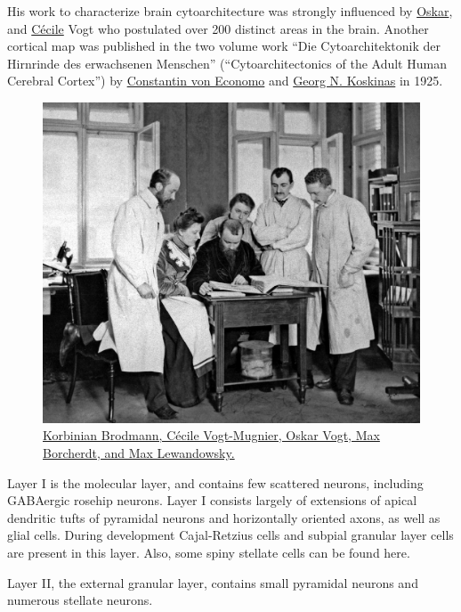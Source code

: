 His work to characterize brain cytoarchitecture was strongly influenced by \href{https://en.wikipedia.org/wiki/Oskar_Vogt}{Oskar}, and \href{https://en.wikipedia.org/wiki/Cécile_Vogt-Mugnier}{Cécile} Vogt who postulated over 200 distinct areas in the brain. Another cortical map was published in the two volume work ``Die Cytoarchitektonik der Hirnrinde des erwachsenen Menschen'' (``Cytoarchitectonics of the Adult Human Cerebral Cortex'') by \href{https://en.wikipedia.org/wiki/Constantin_von_Economo}{Constantin von Economo} and \href{https://en.wikipedia.org/wiki/Georg_N._Koskinas}{Georg N. Koskinas} in 1925.



\begin{figure}

{\centering \includegraphics[width=0.7\linewidth]{./figures/cns/Lewandowsky_Vogts_Brodmann} 

}

\caption{\href{https://commons.wikimedia.org/wiki/File:Lewandowsky_Vogts_Brodmann.JPG}{Korbinian Brodmann, Cécile Vogt-Mugnier, Oskar Vogt, Max Borcherdt, and Max Lewandowsky.}}\label{fig:vogtlab}
\end{figure}

Layer I is the molecular layer, and contains few scattered neurons, including GABAergic rosehip neurons. Layer I consists largely of extensions of apical dendritic tufts of pyramidal neurons and horizontally oriented axons, as well as glial cells. During development Cajal-Retzius cells and subpial granular layer cells are present in this layer. Also, some spiny stellate cells can be found here.

Layer II, the external granular layer, contains small pyramidal neurons and numerous stellate neurons.

